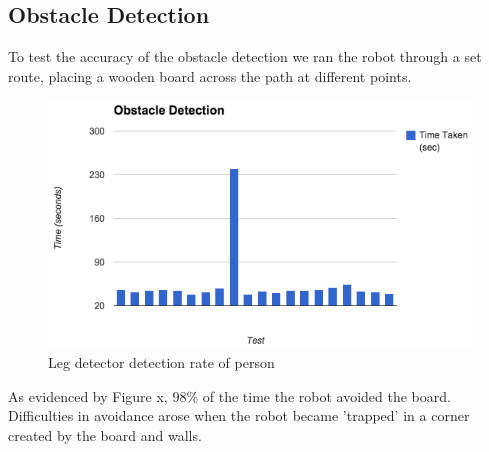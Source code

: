 \documentclass{article}
\begin{document}
\begin{multicols}{2}
	\subsection{Obstacle Detection}
	To test the accuracy of the obstacle detection we ran the robot through a set route, placing a wooden board across the path at different points.
	\begin{figure}[H]
	\begin{center}
	\includegraphics[width=0.8\linewidth]{ExperimentalResults12}
	\caption{Leg detector detection rate of person}
	\end{center}
	\end{figure}
	As evidenced by Figure x, 98\% of the time the robot avoided the board. Difficulties in avoidance arose when the robot became 'trapped' in a corner created by the board and walls.
	

\end{multicols}
\end{document}
